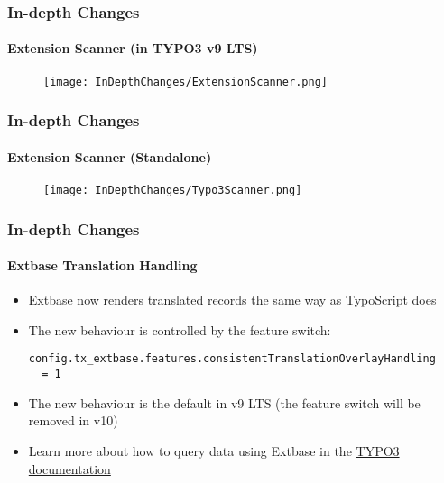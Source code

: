 
\begin{frame}[fragile]
	\frametitle{In-depth Changes}
	\framesubtitle{Extension Scanner (in TYPO3 v9 LTS)}

	\begin{figure}
		\texttt{[image: InDepthChanges/ExtensionScanner.png]}
	\end{figure}

\end{frame}


\begin{frame}[fragile]
	\frametitle{In-depth Changes}
	\framesubtitle{Extension Scanner (Standalone)}

	\begin{figure}
		\texttt{[image: InDepthChanges/Typo3Scanner.png]}
	\end{figure}

\end{frame}


\begin{frame}[fragile]
	\frametitle{In-depth Changes}
	\framesubtitle{Extbase Translation Handling}

	\lstset{basicstyle=\footnotesize\ttfamily}

	\begin{itemize}
		\item Extbase now renders translated records the same way as TypoScript
			does
		\item The new behaviour is controlled by the feature switch:

\begin{lstlisting}
config.tx_extbase.features.consistentTranslationOverlayHandling
  = 1
\end{lstlisting}

		\item The new behaviour is the default in v9 LTS (the feature switch
			will be removed in v10)
		\item Learn more about how to query data using Extbase in the
			\href{https://docs.typo3.org/typo3cms/extensions/core/latest/Changelog/9.5/Important-82363-MakeExtBaseTranslationHandlingConsistentWithTyposcript.html}{TYPO3 documentation}

	\end{itemize}

\end{frame}

